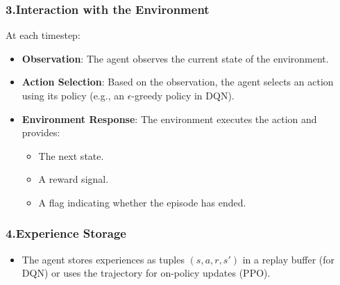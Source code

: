 \subsubsection{3.Interaction with the Environment}
At each timestep:
\begin{itemize}
    \item \textbf{Observation}: The agent observes the current state of the environment.
    \item \textbf{Action Selection}: Based on the observation, the agent selects an action using its policy (e.g., an \(\epsilon\)-greedy policy in DQN).
    \item \textbf{Environment Response}: The environment executes the action and provides:
    \begin{itemize}
        \item The next state.
        \item A reward signal.
        \item A flag indicating whether the episode has ended.
    \end{itemize}
\end{itemize}

\subsubsection{4.Experience Storage}
\begin{itemize}
    \item The agent stores experiences as tuples \((s, a, r, s')\) in a replay buffer (for DQN) or uses the trajectory for on-policy updates (PPO).
\end{itemize}

